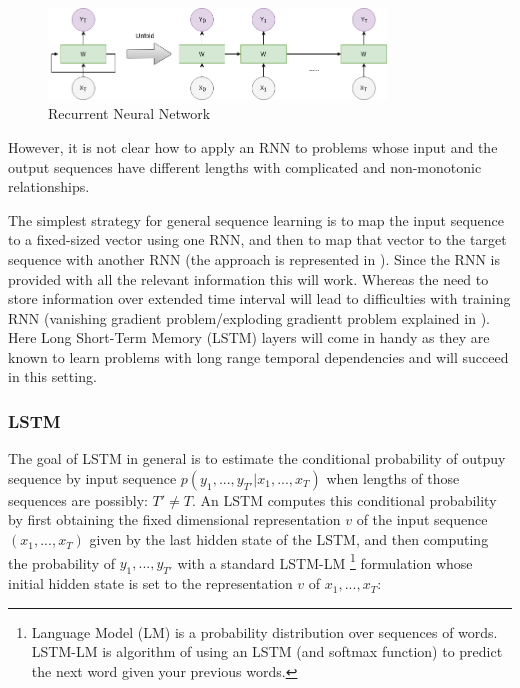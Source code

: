 \begin{figure}[h]
	\centering
	\includegraphics[width=0.8\textwidth]{img/RNN.png}
	\caption{\label{fig:RNN}Recurrent Neural Network}
\end{figure}
 
However, it is not clear how to apply an RNN to problems whose input and the output sequences have different lengths with complicated and non-monotonic relationships.

The simplest strategy for general sequence learning is to map the input sequence to a fixed-sized
vector using one RNN, and then to map that vector to the target sequence with another RNN (the
approach is represented in \cite{baseline_NMT}). Since the RNN is provided with all the relevant information this will work. Whereas the need to store information over extended time interval will lead to difficulties with training RNN (vanishing gradient problem/exploding gradientt problem explained in \cite{LSTM_baseline}).
Here Long Short-Term Memory (LSTM) layers will come in handy as they are known to learn problems with long range temporal dependencies and will succeed in this setting.

\subsubsection{LSTM}

The goal of LSTM in general is to estimate the conditional probability of outpuy sequence by input sequence $p(y_1, ..., y_{T′}|x_1, ..., x_T )$ when lengths of those sequences are possibly: $T' \neq T$. 
An LSTM computes this conditional probability by first obtaining the fixed dimensional
representation $v$ of the input sequence $(x_1, ..., x_T)$ given by the last hidden state of the LSTM, and then computing the probability of $y_1, ..., y_{T′}$ with a standard LSTM-LM
\footnote{Language Model (LM) is a probability distribution over sequences of words. LSTM-LM is algorithm of using an LSTM (and softmax function) to predict the next word given your previous words.} 
formulation whose initial hidden state is set to the representation $v$ of  $x_1, ..., x_T$:

